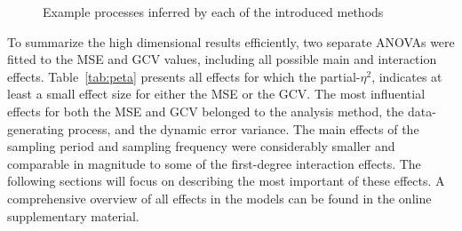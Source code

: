 \documentclass[man, floatsintext]{apa7}
\begin{document}
\begin{sidewaysfigure*}[htbp]
  \caption{Example processes inferred by each of the introduced methods}
  \label{fig:smooth}
\end{sidewaysfigure*}

To summarize the high dimensional results efficiently, two separate ANOVAs were
fitted to the MSE and GCV values, including all possible main and interaction
effects. Table~\ref{tab:peta} presents all effects for which the
partial-$\eta^2$, indicates at least a small effect size for either the MSE or
the GCV\@. The most influential effects for both the MSE and GCV belonged to
the analysis method, the data-generating process, and the dynamic error
variance. The main effects of the sampling period and sampling frequency were
considerably smaller and comparable in magnitude to some of the first-degree
interaction effects. The following sections will focus on describing the most
important of these effects. A comprehensive overview of all effects in the
models can be found in the online supplementary material.
\end{document}
